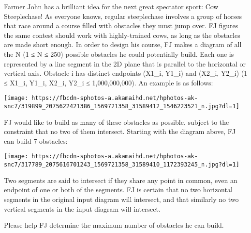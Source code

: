 Farmer John has a brilliant idea for the next great spectator sport: Cow Steeplechase! As everyone knows, regular steeplechase involves a group of horses that race around a course filled with obstacles they must jump over. FJ figures the same contest should work with highly-trained cows, as long as the obstacles are made short enough.  In order to design his course, FJ makes a diagram of all the N (1 ≤ N ≤ 250) possible obstacles he could potentially build. Each one is represented by a line segment in the 2D plane that is parallel to the horizontal or vertical axis. Obstacle i has distinct endpoints (X1\_i, Y1\_i) and (X2\_i, Y2\_i) (1 ≤ X1\_i, Y1\_i, X2\_i, Y2\_i ≤ 1,000,000,000). An example is as follows:   


\texttt{[image: https://fbcdn-sphotos-a.akamaihd.net/hphotos-ak-snc7/319899\_2075622421386\_1569721358\_31589412\_1546223521\_n.jpg?dl=1]}




    FJ would like to build as many of these obstacles as possible, subject to the constraint that no two of them intersect. Starting with the diagram above, FJ can build 7 obstacles:   


\texttt{[image: https://fbcdn-sphotos-a.akamaihd.net/hphotos-ak-snc7/317789\_2075616701243\_1569721358\_31589410\_1172393245\_n.jpg?dl=1]}




    Two segments are said to intersect if they share any point in common, even an endpoint of one or both of the segments.  FJ is certain that no two horizontal segments in the original input diagram will intersect, and that similarly no two vertical segments in the input diagram will intersect.   

    Please help FJ determine the maximum number of obstacles he can build.